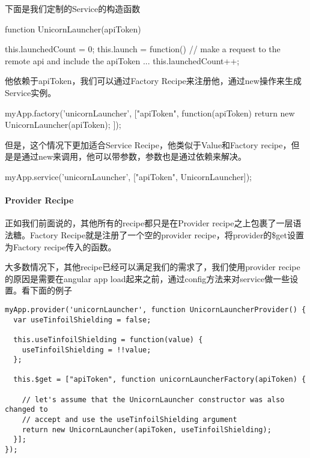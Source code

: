 下面是我们定制的Service的构造函数

\begin{JavaScript}
function UnicornLauncher(apiToken) {

  this.launchedCount = 0;
  this.launch = function() {
    // make a request to the remote api and include the apiToken
    ...
    this.launchedCount++;
  }
}
\end{JavaScript}

他依赖于apiToken，我们可以通过Factory Recipe来注册他，通过new操作来生成Service实例。

\begin{JavaScript}
myApp.factory('unicornLauncher', ["apiToken", function(apiToken) {
  return new UnicornLauncher(apiToken);
}]);
\end{JavaScript}

但是，这个情况下更加适合Service Recipe，他类似于Value和Factory recipe，但是是通过new来调用，他可以带参数，参数也是通过依赖来解决。

\begin{JavaScript}
myApp.service('unicornLauncher', ["apiToken", UnicornLauncher]);
\end{JavaScript}



\paragraph{Provider Recipe}


正如我们前面说的，其他所有的recipe都只是在Provider recipe之上包裹了一层语法糖。Factory Recipe就是注册了一个空的provider recipe，将provider的\$get设置为Factory recipe传入的函数。

大多数情况下，其他recipe已经可以满足我们的需求了，我们使用provider recipe的原因是需要在angular app load起来之前，通过config方法来对service做一些设置。看下面的例子

\begin{lstlisting}
myApp.provider('unicornLauncher', function UnicornLauncherProvider() {
  var useTinfoilShielding = false;

  this.useTinfoilShielding = function(value) {
    useTinfoilShielding = !!value;
  };

  this.$get = ["apiToken", function unicornLauncherFactory(apiToken) {

    // let's assume that the UnicornLauncher constructor was also changed to
    // accept and use the useTinfoilShielding argument
    return new UnicornLauncher(apiToken, useTinfoilShielding);
  }];
});
\end{lstlisting}

